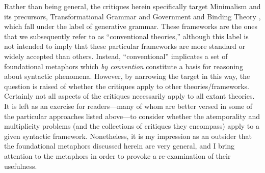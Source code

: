 Rather than being general, the critiques herein specifically target Minimalism and its precursors, Transformational Grammar \citep{Chomsky1965} and Government and Binding Theory \citep{Chomsky1982}, which fall under the label of generative grammar. These frameworks are the ones that we subsequently refer to as “conventional theories,” although this label is not intended to imply that these particular frameworks are more standard or widely accepted than others. Instead, “conventional” implicates a set of foundational metaphors which \textit{by convention} constitute a basis for reasoning about syntactic phenomena. However, by narrowing the target in this way, the question is raised of whether the critiques apply to other theories/frameworks. Certainly not all aspects of the critiques necessarily apply to all extant theories. It is left as an exercise for readers—many of whom are better versed in some of the particular approaches listed above—to consider whether the atemporality and multiplicity problems (and the collections of critiques they encompass) apply to a given syntactic framework. Nonetheless, it is my impression as an outsider that the foundational metaphors discussed herein are very general, and I bring attention to the metaphors in order to provoke a re-examination of their usefulness.

